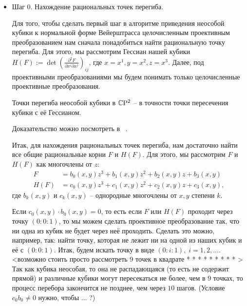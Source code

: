 \begin{itemize}[leftmargin=0.6cm]
    
    \item Шаг 0. Нахождение рациональных точек перегиба. 

    Для того, чтобы сделать первый шаг в алгоритме приведения неособой
    кубики к нормальной форме Вейерштрасса целочисленным проективным
    преобразованием нам сначала понадобиться найти рациональную точку
    перегиба. Для этого, мы рассмотрим Гессиан нашей кубики \(H(F) := \det \left(
    \frac{\partial^2 F}{\partial x^{i} \partial x^{j}}\right)_{ij}\), где \(x =
    x^{1}, y = x^{2}, z = x^{3}\). Далее, под проективными
    преобразованиями мы будем понимать только целочисленные проективные
    преобразования.

    \begin{theoremf}
        Точки перегиба неособой кубики в \(\mathbb{C} \mathrm{P}^2\) -- в точности
        точки пересечения кубики с её Гессианом.
    \end{theoremf}

    Доказательство можно посмотреть в ~\cite{pra_sol}.

    Итак, для нахождения рациональных точек перегиба, нам достаточно найти
    все общие рациональные корни \(F\) и \(H(F)\). Для этого, мы
    рассмотрим \(F\) и \(H(F)\) как многочлены от \(z\):
    \begin{align*}
        F &= b_0(x, y) z^3 + b_1(x, y) z^2 + b_2(x, y) z + b_3(x, y) \\
        H(F) &= c_0(x, y) z^3 + c_1(x, y) z^2 + c_2(x, y) z + c_3(x, y) 
    ,\end{align*}
    где \(b_k(x, y)\) и \(c_k(x, y)\) -- однородные многочлены от \(x, y\) 
    степени \(k\). 

    Если \(c_0(x, y) \cdot b_0(x, y) = 0\), то есть если
    \(F\) или \(H(F)\) проходит через точку \((0 : 0 : 1)\), то мы можем
    сделать проективное преобразование так, что ни одна из кубик не будет
    через неё проходить. Сделать это можно, например, так: найти точку,
    которая не лежит ни на одной из наших кубик и  её
    с \((0 : 0 : 1)\). Итак, будем искать точку в виде \((0 : i : 1), \; i
    = 1, 2, \ldots\). <возможно стоить просто рассмотреть 9 точек в квадрате 
    * * *
    * * *
    * * *
    >
    Так как кубика неособая, то она не распадающаяся (то есть не содержит
    прямой) и различные кубики могут пересекаться не более, чем в \(9\) 
    точках, то процесс перебора закончится не позднее, чем через \(10\) 
    шагов. (Условие \(c_0 b_0 \ne 0\) нужно, чтобы ... ?)


\end{itemize}
